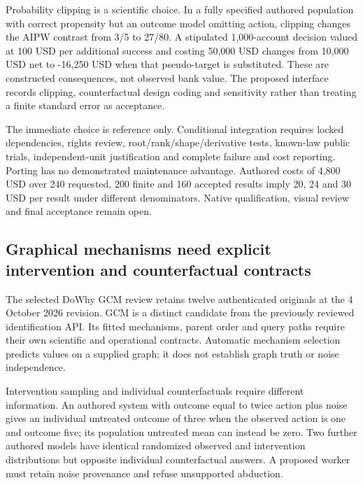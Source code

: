 Probability clipping is a scientific choice. In a fully specified
authored population with correct propensity but an outcome model
omitting action, clipping changes the AIPW contrast from 3/5 to 27/80. A
stipulated 1,000-account decision valued at 100 USD per additional
success and costing 50,000 USD changes from 10,000 USD net to -16,250
USD when that pseudo-target is substituted. These are constructed
consequences, not observed bank value. The proposed interface records
clipping, counterfactual design coding and sensitivity rather than
treating a finite standard error as acceptance.
\citep{exec24_delicatessen_choice}

The immediate choice is reference only. Conditional integration requires
locked dependencies, rights review, root/rank/shape/derivative tests,
known-law public trials, independent-unit justification and complete
failure and cost reporting. Porting has no demonstrated maintenance
advantage. Authored costs of 4,800 USD over 240 requested, 200 finite
and 160 accepted results imply 20, 24 and 30 USD per result under
different denominators. Native qualification, visual review and final
acceptance remain open.
\citep{exec24_delicatessen_source,exec24_delicatessen_choice}

\hypertarget{graphical-mechanisms-need-explicit-intervention-and-counterfactual-contracts}{%
\subsection{Graphical mechanisms need explicit intervention and
counterfactual
contracts}\label{graphical-mechanisms-need-explicit-intervention-and-counterfactual-contracts}}

The selected DoWhy GCM review retains twelve authenticated originals at
the 4 October 2026 revision. GCM is a distinct candidate from the
previously reviewed identification API. Its fitted mechanisms, parent
order and query paths require their own scientific and operational
contracts. Automatic mechanism selection predicts values on a supplied
graph; it does not establish graph truth or noise
independence.\citep{exec24_gcm_source,exec24_gcm_choice}

Intervention sampling and individual counterfactuals require different
information. An authored system with outcome equal to twice action plus
noise gives an individual untreated outcome of three when the observed
action is one and outcome five; its population untreated mean can
instead be zero. Two further authored models have identical randomized
observed and intervention distributions but opposite individual
counterfactual answers. A proposed worker must retain noise provenance
and refuse unsupported abduction.\citep{exec24_gcm_choice}


